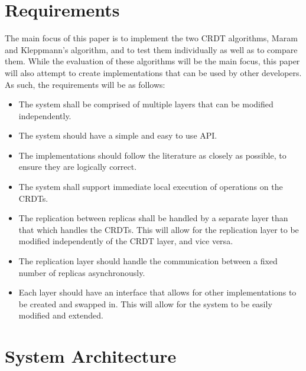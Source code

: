 \documentclass[12pt]{report}
\begin{document}
\section{Requirements}
The main focus of this paper is to implement the two CRDT algorithms, Maram\cite{9563274} and Kleppmann's algorithm\cite{https://doi.org/10.48550/arxiv.2103.04828}, and to test them individually as well as to compare them. While the evaluation of these algorithms will be the main focus, this paper will also attempt to create implementations that can be used by other developers. As such, the requirements will be as follows:
\begin{itemize}
    \item The system shall be comprised of multiple layers that can be modified independently.
    \item The system should have a simple and easy to use API.
    \item The implementations should follow the literature as closely as possible, to ensure they are logically correct.
    \item The system shall support immediate local execution of operations on the CRDTs.
    \item The replication between replicas shall be handled by a separate layer than that which handles the CRDTs. This will allow for the replication layer to be modified independently of the CRDT layer, and vice versa.
    \item The replication layer should handle the communication between a fixed number of replicas asynchronously.
    \item Each layer should have an interface that allows for other implementations to be created and swapped in. This will allow for the system to be easily modified and extended.
\end{itemize}


\section{System Architecture}\label{sec:architecture}
\end{document}

